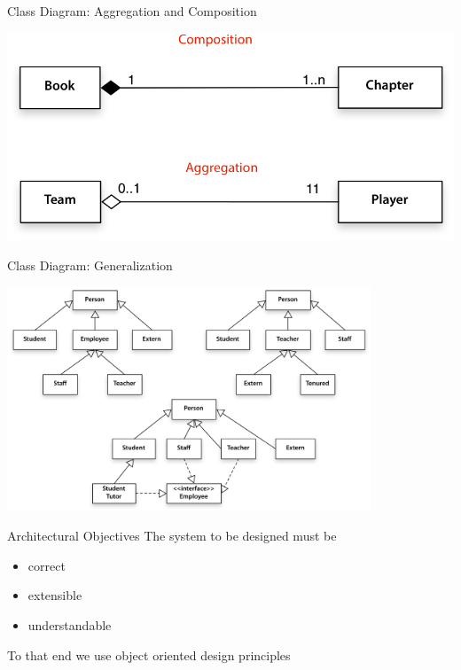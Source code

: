 \begin{frame}{Class Diagram: Aggregation and Composition}
\begin{center}
  \includegraphics[scale=0.6]{aggregation.png}
\end{center}

\end{frame}

\begin{frame}{Class Diagram: Generalization}
\begin{center}
  \includegraphics[height=190pt]{generalization.png}
\end{center}

\end{frame}

%
\begin{frame}{Architectural Objectives}
	The system to be designed must be
       \begin{itemize}
           \item correct
           \item extensible
           \item understandable
       \end{itemize}
	To that end we use object oriented design principles
\end{frame}

